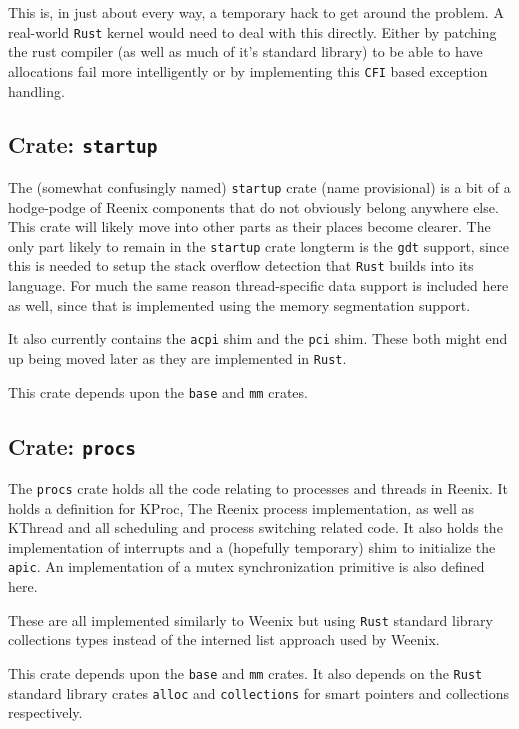 \documentclass[12pt,letterpaper]{article}
\newcommand{\rust}{\texttt{Rust}}
\begin{document}
This is, in just about every way, a temporary hack to get around
the problem. A real-world \rust{} kernel would need to deal with this
directly. Either by patching the rust compiler (as well as much of it's
standard library) to be able to have allocations fail more intelligently
or by implementing this \texttt{CFI} based exception handling.

\subsection{Crate: \texttt{startup}}
The (somewhat confusingly named) \texttt{startup} crate (name provisional)
is a bit of a hodge-podge of Reenix components that do not obviously
belong anywhere else. This crate will likely move into other parts
as their places become clearer. The only part likely to remain in the
\texttt{startup} crate longterm is the \texttt{gdt} support, since this
is needed to setup the stack overflow detection that \rust{} builds into
its language. For much the same reason thread-specific data support
is included here as well, since that is implemented using the memory
segmentation support.

It also currently contains the \texttt{acpi} shim and the \texttt{pci}
shim. These both might end up being moved later as they are implemented in \rust{}.

This crate depends upon the \texttt{base} and \texttt{mm} crates.

\subsection{Crate: \texttt{procs}}
The \texttt{procs} crate holds all the code relating to processes and
threads in Reenix. It holds a definition for KProc, The Reenix process
implementation, as well as KThread and all scheduling and process
switching related code. It also holds the implementation of interrupts
and a (hopefully temporary) shim to initialize the \texttt{apic}. An
implementation of a mutex synchronization primitive is also defined here.

These are all implemented similarly to Weenix but using \rust{} standard
library collections types instead of the interned list approach used
by Weenix.

This crate depends upon the \texttt{base} and \texttt{mm} crates. It
also depends on the \rust{} standard library crates \texttt{alloc}
and \texttt{collections} for smart pointers and collections respectively.
\end{document}
